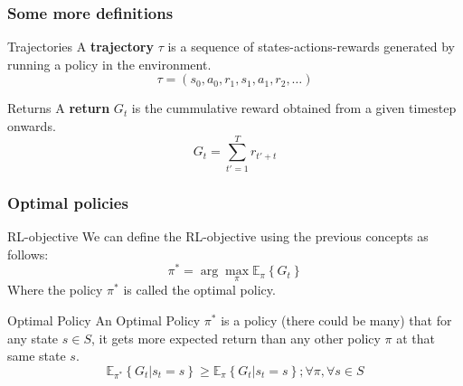 \begin{frame}
    \frametitle{Some more definitions}
    \begin{block}{Trajectories}
        A \textbf{trajectory} $\tau$ is a sequence of states-actions-rewards generated by running
        a policy in the environment.
        \begin{equation*}
            \tau = (s_{0},a_{0},r_{1},s_{1},a_{1},r_{2},\hdots)
        \end{equation*}
    \end{block}
    \pause
    \begin{block}{Returns}
        A \textbf{return} $G_{t}$ is the cummulative reward obtained from a given timestep
        onwards.
        \begin{equation*}
            G_{t} = \sum_{t'=1}^{T} r_{t' + t}
        \end{equation*}
    \end{block}
\end{frame}

\begin{frame}
    \frametitle{Optimal policies}
    \begin{block}{RL-objective}
        We can define the RL-objective using the previous concepts as follows:
        \begin{equation*}
            \pi^{*} = \arg \max_{\pi} \mathbb{E}_{\pi} \left \{ G_{t} \right \}
        \end{equation*}
        Where the policy $\pi^{*}$ is called the optimal policy.
    \end{block}
    \pause
    \begin{block}{Optimal Policy}
        An Optimal Policy $\pi^{*}$ is a policy (there could be many) that for any
        state $s \in S$, it gets more expected return than any other policy $\pi$
        at that same state $s$.
        \begin{equation*}
            \mathbb{E}_{\pi^{*}} \left \{ G_{t} | s_{t} = s \right \} \geq
            \mathbb{E}_{\pi} \left \{ G_{t} | s_{t} = s \right \}; \forall \pi, \forall s \in S
        \end{equation*}
    \end{block}
\end{frame}

